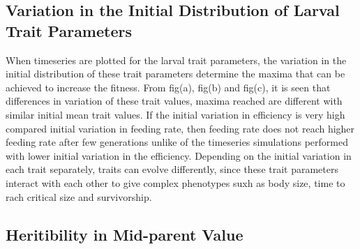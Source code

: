 \subsection{Variation in the Initial Distribution of Larval Trait Parameters}
When timeseries are plotted for the larval trait parameters, the variation in the initial distribution of these trait parameters determine the maxima that can be achieved to increase the fitness. From fig(a), fig(b) and fig(c), it is seen that differences in variation of these trait values, maxima reached are different with similar initial mean trait values. If the initial variation in efficiency is very high compared initial variation in feeding rate, then feeding rate does not reach higher feeding rate after few generations unlike of the timeseries simulations performed with lower initial variation in the efficiency. Depending on the initial variation in each trait separately, traits can evolve differently, since these trait parameters interact with each other to give complex phenotypes suxh as body size, time to rach critical size and survivorship. 
\subsection{Heritibility in Mid-parent Value}


\pagebreak



